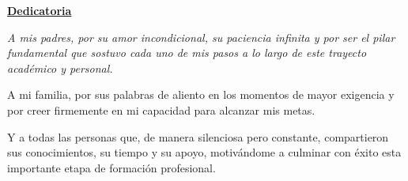 \vfill

\begin{flushright}
\textbf{\underline{Dedicatoria}}
\end{flushright}

\vspace{0.5cm}

\begin{flushright}
\begin{minipage}{0.7\textwidth}
\itshape
\justify
A mis padres, por su amor incondicional, su paciencia infinita y por ser el pilar fundamental que sostuvo cada uno de mis pasos a lo largo de este trayecto académico y personal. 

A mi familia, por sus palabras de aliento en los momentos de mayor exigencia y por creer firmemente en mi capacidad para alcanzar mis metas.

Y a todas las personas que, de manera silenciosa pero constante, compartieron sus conocimientos, su tiempo y su apoyo, motivándome a culminar con éxito esta importante etapa de formación profesional.
\end{minipage}
\end{flushright}